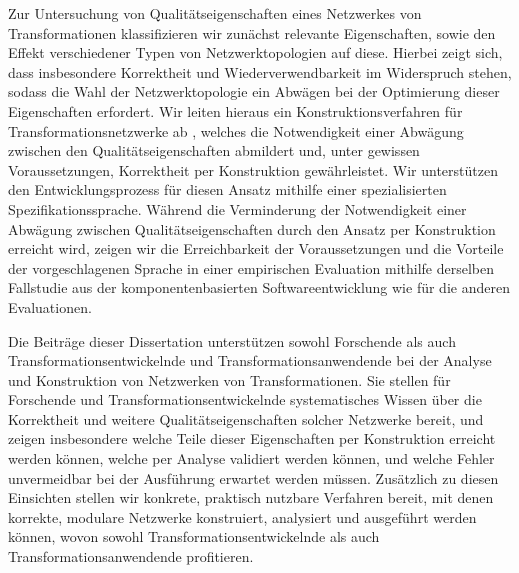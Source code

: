 Zur Untersuchung von Qualitätseigenschaften eines Netzwerkes von Transformationen klassifizieren wir zunächst relevante Eigenschaften, sowie den Effekt verschiedener Typen von Netzwerktopologien auf diese. %
Hierbei zeigt sich, dass insbesondere Korrektheit und Wiederverwendbarkeit im Widerspruch stehen, sodass die Wahl der Netzwerktopologie ein Abwägen bei der Optimierung dieser Eigenschaften erfordert.
Wir leiten hieraus ein Konstruktionsverfahren für Transformationsnetzwerke ab%
, welches die Notwendigkeit einer Abwägung zwischen den Qualitätseigenschaften abmildert und, unter gewissen Voraussetzungen, Korrektheit per Konstruktion gewährleistet. %
Wir unterstützen den Entwicklungsprozess für diesen Ansatz mithilfe einer spezialisierten Spezifikationssprache.
Während die Verminderung der Notwendigkeit einer Abwägung zwischen Qualitätseigenschaften durch den Ansatz per Konstruktion erreicht wird, zeigen wir die Erreichbarkeit der Voraussetzungen und die Vorteile der vorgeschlagenen Sprache in einer empirischen Evaluation mithilfe derselben Fallstudie aus der komponentenbasierten Softwareentwicklung wie für die anderen Evaluationen.

Die Beiträge dieser Dissertation unterstützen sowohl Forschende als auch Transformationsentwickelnde und Transformationsanwendende bei der Analyse und Konstruktion von Netzwerken von Transformationen. %
Sie stellen für Forschende und Transformationsentwickelnde systematisches Wissen über die Korrektheit und weitere Qualitätseigenschaften solcher Netzwerke bereit, und zeigen insbesondere welche Teile dieser Eigenschaften per Konstruktion erreicht werden können, welche per Analyse validiert werden können, und welche Fehler unvermeidbar bei der Ausführung erwartet werden müssen.
Zusätzlich zu diesen Einsichten stellen wir konkrete, praktisch nutzbare Verfahren bereit, mit denen korrekte, modulare Netzwerke konstruiert, analysiert und ausgeführt werden können, wovon sowohl Transformationsentwickelnde als auch Transformationsanwendende profitieren.

